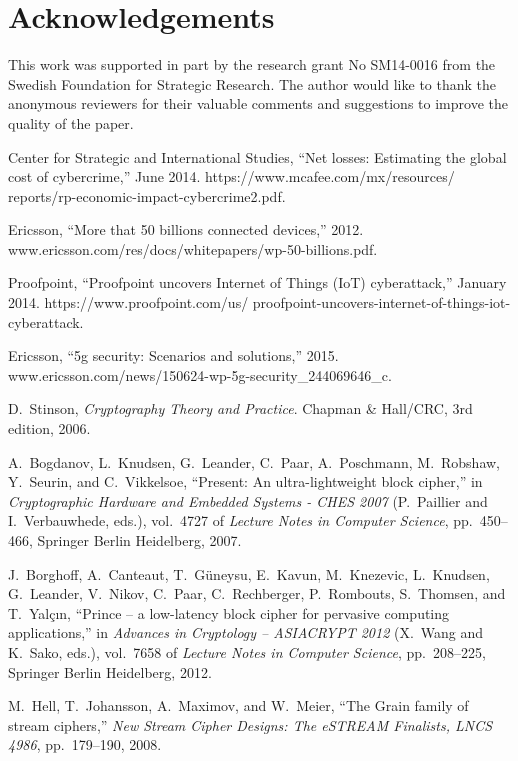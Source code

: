 \documentclass[9pt,conference]{IEEEtran} \usepackage{times}
\begin{document}
\section{Acknowledgements}
This work was supported in part by the research grant No SM14-0016 from the Swedish Foundation for Strategic Research. The author would like to thank the anonymous reviewers for their valuable comments and suggestions to improve the
quality of the paper.




\begin{thebibliography}{10}

{Center for Strategic and International Studies}, ``Net losses: Estimating the
  global cost of cybercrime,'' June 2014.
\newblock https://www.mcafee.com/mx/resources/
  reports/rp-economic-impact-cybercrime2.pdf.

{Ericsson}, ``More that 50 billions connected devices,'' 2012.
\newblock www.ericsson.com/res/docs/whitepapers/wp-50-billions.pdf.

{Proofpoint}, ``Proofpoint uncovers {I}nternet of {T}hings ({IoT})
  cyberattack,'' January 2014.
\newblock https://www.proofpoint.com/us/
  proofpoint-uncovers-internet-of-things-iot-cyberattack.

{Ericsson}, ``5g security: Scenarios and solutions,'' 2015.
\newblock www.ericsson.com/news/150624-wp-5g-security\_244069646\_c.

D.~Stinson, {\em Cryptography Theory and Practice}.
\newblock Chapman \& Hall/CRC, 3rd edition, 2006.

A.~Bogdanov, L.~Knudsen, G.~Leander, C.~Paar, A.~Poschmann, M.~Robshaw,
  Y.~Seurin, and C.~Vikkelsoe, ``Present: An ultra-lightweight block cipher,''
  in {\em Cryptographic Hardware and Embedded Systems - CHES 2007} (P.~Paillier
  and I.~Verbauwhede, eds.), vol.~4727 of {\em Lecture Notes in Computer
  Science}, pp.~450--466, Springer Berlin Heidelberg, 2007.

J.~Borghoff, A.~Canteaut, T.~Güneysu, E.~Kavun, M.~Knezevic, L.~Knudsen,
  G.~Leander, V.~Nikov, C.~Paar, C.~Rechberger, P.~Rombouts, S.~Thomsen, and
  T.~Yalçın, ``Prince – a low-latency block cipher for pervasive computing
  applications,'' in {\em Advances in Cryptology – ASIACRYPT 2012} (X.~Wang
  and K.~Sako, eds.), vol.~7658 of {\em Lecture Notes in Computer Science},
  pp.~208--225, Springer Berlin Heidelberg, 2012.

M.~Hell, T.~Johansson, A.~Maximov, and W.~Meier, ``The {G}rain family of stream
  ciphers,'' {\em New Stream Cipher Designs: The eSTREAM Finalists, LNCS 4986},
  pp.~179--190, 2008.


\end{thebibliography}
\end{document}
